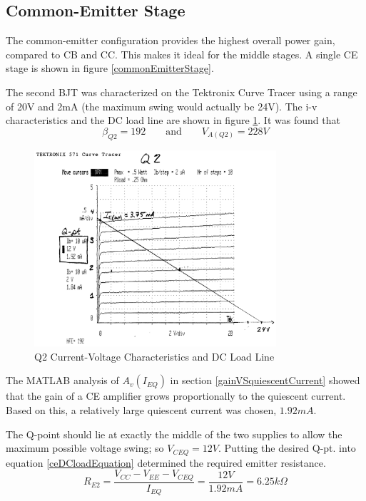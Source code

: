 \documentclass[titlepage, letterpaper, 11pt]{article}
\begin{document}
\subsection{Common-Emitter Stage}

The common-emitter configuration provides the highest overall power
gain, compared to CB and CC. This makes it ideal for the middle
stages. A single CE stage is shown in figure 
\ref{commonEmitterStage}.

The second BJT was characterized on the Tektronix Curve Tracer
using a range of 20V and 2mA (the maximum swing would actually be
24V). The i-v characteristics and the DC load line are shown in
figure \ref{q2Characteristics}. It was found that
\begin{equation*}
\beta_{Q2}=192\qquad\textrm{and}\qquad V_{A(Q2)}=228V
\end{equation*}

\begin{figure}[ht]
	\centering
	\includegraphics[width=0.8\textwidth]
		{measurements/q2Characteristics}
	\caption{
		Q2 Current-Voltage Characteristics and DC Load Line
	}
	\label{q2Characteristics}
\end{figure}

The MATLAB analysis of $A_{v}(I_{EQ})$ in section
\ref{gainVSquiescentCurrent} showed that the gain of a CE amplifier
grows proportionally to the quiescent current. Based on this, a
relatively large quiescent current was chosen, $1.92mA$.

The Q-point should lie at exactly the middle of the two supplies to
allow the maximum possible voltage swing; so $V_{CEQ}=12V$. Putting
the desired Q-pt. into equation \ref{ceDCloadEquation} determined
the required emitter resistance.
\begin{equation*}
R_{E2}=\frac{V_{CC}-V_{EE}-V_{CEQ}}{I_{EQ}}=\frac{12V}{1.92mA}
=6.25k\Omega
\end{equation*}
\end{document}
